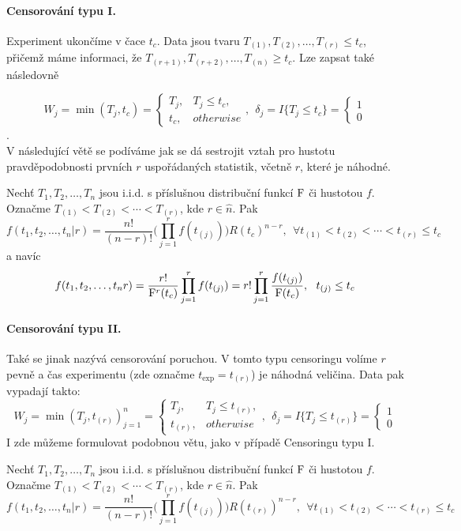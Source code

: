 \paragraph{Censorování typu I.} Experiment ukončíme v čace $t_c$. Data jsou tvaru $T_{(1)},T_{(2)},\dots, T_{(r)} \leq t_c$, přičemž máme informaci, že $T_{(r+1)},T_{(r+2)},\dots, T_{(n)} \geq t_c$. Lze zapsat také následovně 

$$W_j = \min(T_j,t_c) = \begin{cases}
	T_j,& T_j\leq t_c,\\ t_c,& otherwise
\end{cases}, ~~\delta_j = I\lbrace T_j \leq t_c \rbrace = \begin{cases}
	1\\ 
	0
\end{cases}$$. \\
V následující větě se podíváme jak se dá sestrojit vztah pro hustotu pravděpodobnosti prvních $r$ uspořádaných statistik, včetně $r$, které je náhodné.
\begin{theorem}
	Nechť $T_1, T_2, \dots, T_n$ jsou i.i.d. s příslušnou distribuční funkcí $\mathrm{F}$ či hustotou $f$. Označme $T_{(1)} < T_{(2)} < \cdots <T_{(r)}$, kde $r\in\hat{n}$. Pak $$f(t_1, t_2, \dots, t_n| r) = \frac{n!}{(n-r)!}\Big(\prod_{j=1}^r f(t_{(j)})\Big)R(t_c)^{n-r}, ~~ \forall t_{(1)} < t_{(2)} < \cdots <t_{(r)} \leq t_c $$ 
	a navíc
	$$f(t_1, t_2, \dots, t_n r) = \frac{r!}{\mathrm{F}^r(t_c)}\prod_{j=1}^r f(t_{(j)}) = r! \prod_{j=1}^r  \frac{f(t_{(j)})}{\mathrm{F}(t_{c})}, ~~ t_{(j)} \leq t_c$$ 
\end{theorem}

\paragraph{Censorování typu II.}
Také se jinak nazývá censorování poruchou. V tomto typu censoringu volíme $r$ pevně a čas experimentu (zde označme $t_{\mathrm{exp}} = t_{(r)}$) je náhodná veličina. Data pak vypadají takto: 
$$W_j = \min(T_j, t_{(r)})_{j=1}^n = \begin{cases}
	T_j,& T_j\leq t_{(r)},\\ t_{(r)},& otherwise
\end{cases},~~\delta_j = I\lbrace T_j \leq t_{(r)} \rbrace = \begin{cases}
	1\\ 
	0
\end{cases}
$$
I zde můžeme formulovat podobnou větu, jako v případě Censoringu typu I.
\begin{theorem}
	Nechť $T_1, T_2, \dots, T_n$ jsou i.i.d. s příslušnou distribuční funkcí $\mathrm{F}$ či hustotou $f$. Označme $T_{(1)} < T_{(2)} < \cdots <T_{(r)}$, kde $r\in\hat{n}$. 
	Pak $$f(t_1, t_2, \dots, t_n| r) = \frac{n!}{(n-r)!}\Big(\prod_{j=1}^r f(t_{(j)})\Big)R(t_{(r)})^{n-r}, ~~ \forall t_{(1)} < t_{(2)} < \cdots <t_{(r)} \leq t_c $$ 
	
\end{theorem}
